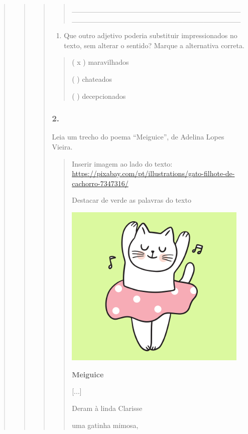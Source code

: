 \begin{quote}
\begin{quote}
\begin{quote}
\begin{quote}
\_\_\_\_\_\_\_\_\_\_\_\_\_\_\_\_\_\_\_\_\_\_\_\_\_\_\_\_\_\_\_\_\_\_\_\_\_\_\_\_\_\_\_\_\_\_\_\_\_\_\_\_\_\_\_\_\_\_\_\_\_\_\_\_
\end{quote}

\begin{enumerate}
\def\labelenumi{\alph{enumi})}
\item
  Que outro adjetivo poderia substituir impressionados no texto, sem
  alterar o sentido? Marque a alternativa correta.
\end{enumerate}

\begin{quote}
( x ) maravilhados

( ) chateados

( ) decepcionados
\end{quote}

\subsubsection{2. }\label{section-58}

Leia um trecho do poema ``Meiguice'', de Adelina Lopes Vieira.

\begin{quote}
Inserir imagem ao lado do texto:
\url{https://pixabay.com/pt/illustrations/gato-filhote-de-cachorro-7347316/}

Destacar de verde as palavras do texto

\includegraphics[width=3.41667in,height=3.07500in]{media/image23.png}

\textbf{Meiguice}

{[}...{]}

Deram à linda Clarisse

uma gatinha mimosa,


\end{quote}
\end{quote}
\end{quote}
\end{quote}
